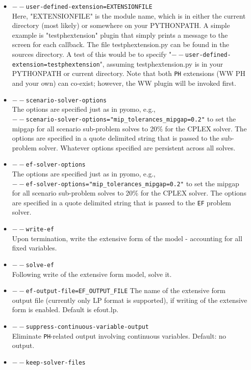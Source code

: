 \documentclass[a4paper]{article}
\begin{document}
\begin{itemize}
	\item \texttt{$--$user-defined-extension=EXTENSIONFILE}\\
	Here, "EXTENSIONFILE" is the module name, which is in either the current directory (most likely) or somewhere on your PYTHONPATH. A simple example is "testphextension" plugin that simply prints a message to the screen for each callback. The file testphextension.py can be found in the sources directory. A test of this would be to specify "\texttt{$--$user-defined-extension=testphextension}", assuming testphextension.py is in your PYTHONPATH or current directory. Note that both \texttt{PH} extensions (WW PH and your own) can co-exist; however, the WW plugin will be invoked first. 
	\item \texttt{$--$scenario-solver-options}\\
	The options are specified just as in pyomo, e.g.,\\ 
	\texttt{$--$scenario-solver-options="mip\_tolerances\_mipgap=0.2"} to set the mipgap for all scenario sub-problem solves to 20\% for the CPLEX solver. The options are specified in a quote delimited string that is passed to the sub-problem solver. Whatever options specified are persistent across all solves.
	\item \texttt{$--$ef-solver-options}\\
	The options are specified just as in pyomo, e.g., \\
	\texttt{$--$ef-solver-options="mip\_tolerances\_mipgap=0.2"} to set the mipgap for all scenario sub-problem solves to 20\% for the CPLEX solver. The options are specified in a quote delimited string that is passed to the \texttt{EF} problem solver.
	\item \texttt{$--$write-ef}\\
	Upon termination, write the extensive form of the model - accounting for all fixed variables. 
	\item \texttt{$--$solve-ef}\\
	Following write of the extensive form model, solve it. 
	\item \texttt{$--$ef-output-file=EF\_OUTPUT\_FILE}
	The name of the extensive form output file (currently only LP format is supported), if writing of the extensive form is enabled. Default is efout.lp.
	\item \texttt{$--$suppress-continuous-variable-output}\\
	Eliminate \texttt{PH}-related output involving continuous variables. Default: no output.
	\item \texttt{$--$keep-solver-files}\\

\end{itemize}
\end{document}
